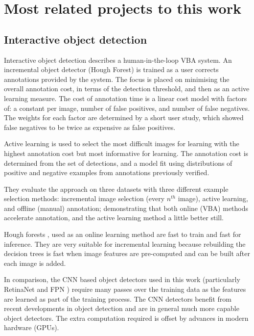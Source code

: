 \section {Most related projects to this work}
\label{sec:closest}

\subsection {Interactive object detection \texorpdfstring{\cite{Yao2012}}{}}

Interactive object detection \cite{Yao2012} describes a human-in-the-loop \gls{VBA} system. An incremental object detector (Hough Forest) is trained as a user corrects annotations provided by the system. The focus is placed on minimising the overall annotation cost, in terms of the detection threshold, and then as an active learning measure. 
The cost of annotation time is a linear cost model with factors of: a constant per image, number of false positives, and number of false negatives. The weights for each factor are determined by a short user study, which showed false negatives to be twice as expensive as false positives. 

Active learning is used to select the most difficult images for learning with the highest annotation cost but most informative for learning. The annotation cost is determined from the set of detections, and a model fit using distributions of positive and negative examples from annotations previously verified. 

They evaluate the approach on three datasets with three different example selection methods: incremental image selection (every $n^{th}$ image), active learning, and offline (manual) annotation; demonstrating that both online (\gls{VBA}) methods accelerate annotation, and the active learning method a little better still.

Hough forests \cite{Gall2011}, used as an online learning method are fast to train and fast for inference. They are very suitable for incremental learning because rebuilding the decision trees is fast when image features are pre-computed and can be built after each image is added. 

In comparison, the \gls{CNN} based object detectors used in this work (particularly RetinaNet \cite{Lin2017} and \gls{FPN} \cite{Lin2017a}) require many passes over the training data as the features are learned as part of the training process. The \gls{CNN} detectors benefit from recent developments in object detection and are in general much more capable object detectors. The extra computation required is offset by advances in modern hardware (\gls{GPU}s).

